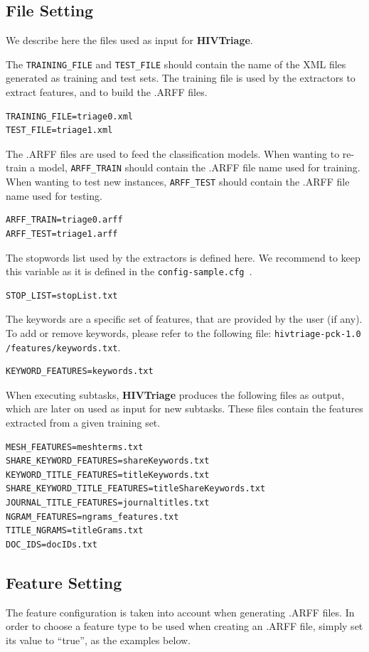 \documentclass[11pt]{article}
\newcommand{\system}{{\bf{HIVTriage}}}
\newcommand{\homefolder}{\texttt{hivtriage-pck-\version{ }}}
\newcommand{\configsample}{\texttt{config-sample.cfg{ }}}
\def\version{{\tt 1.0}}
\begin{document}
\subsection{File Setting}
\label{subsec:fileset}
We describe here the files used as input for \system{}.

The \texttt{TRAINING\_FILE} and \texttt{TEST\_FILE} should contain the name of the XML files generated as training and test sets.
The training file is used by the extractors to extract features, and to build the .ARFF files.
\begin{lstlisting}
TRAINING_FILE=triage0.xml
TEST_FILE=triage1.xml
\end{lstlisting}

The .ARFF files are used to feed the classification models. 
When wanting to re-train a model, \texttt{ARFF\_TRAIN} should contain the .ARFF file name used for training.
When wanting to test new instances, \texttt{ARFF\_TEST} should contain the .ARFF file name used for testing.
\begin{lstlisting}
ARFF_TRAIN=triage0.arff
ARFF_TEST=triage1.arff
\end{lstlisting}

The stopwords list used by the extractors is defined here.
We recommend to keep this variable as it is defined in the \configsample.
\begin{lstlisting}
STOP_LIST=stopList.txt
\end{lstlisting}

The keywords are a specific set of features, that are provided by the user (if any).
To add or remove keywords, please refer to the following file:
\homefolder\texttt{/features/keywords.txt}.
\begin{lstlisting}
KEYWORD_FEATURES=keywords.txt
\end{lstlisting}

When executing subtasks, \system{} produces the following files as output, 
which are later on used as input for new subtasks.
These files contain the features extracted from a given training set.
\begin{lstlisting}
MESH_FEATURES=meshterms.txt
SHARE_KEYWORD_FEATURES=shareKeywords.txt
KEYWORD_TITLE_FEATURES=titleKeywords.txt
SHARE_KEYWORD_TITLE_FEATURES=titleShareKeywords.txt
JOURNAL_TITLE_FEATURES=journaltitles.txt
NGRAM_FEATURES=ngrams_features.txt
TITLE_NGRAMS=titleGrams.txt
DOC_IDS=docIDs.txt
\end{lstlisting}

\subsection{Feature Setting}
\label{subsec:featureset}
The feature configuration is taken into account when generating .ARFF files.
In order to choose a feature type to be used when creating an .ARFF file, simply set its value to ``true'', as the examples below. \\
\end{document}
